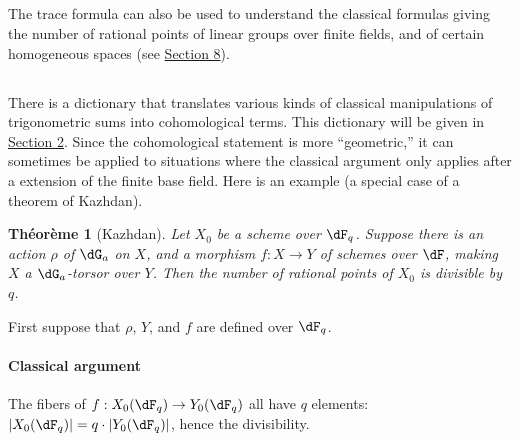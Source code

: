 \documentclass[oneside]{book}
\theoremstyle{sga-source}
\theoremstyle{sga-source-dash}
\theoremstyle{sga-source-dotdash}
\theoremstyle{sga-source-number-note-dash}
\theoremstyle{sga-source-note-number-dotdash}
\theoremstyle{sga-source-example-dotdash}
\theoremstyle{sga-source-inline-number}
\theoremstyle{sga-source-bare-number}
\theoremstyle{sga-source}
\newtheorem{theorem_}[subsection]{Théorème}
\newcommand{\PrintPage}[1]{}\newcommand{\MathPage}[1]{}\newcommand{\PrintCite}[2]{#1}\newcommand{\var}[3]{#1}
\begin{document}
\subsection{}\label{VI:1-11}

The trace formula can also be used to understand the classical formulas 
giving the number of rational points of linear groups over 
finite fields, and of certain homogeneous spaces (see \hyperref[VI:8]{Section 8}). 





\subsection{}\label{VI:1-12}

There is a dictionary that translates various kinds of classical 
manipulations of trigonometric sums into cohomological terms. This dictionary 
will be given in \hyperref[VI:2]{Section 2}. Since the cohomological statement is more 
``geometric,'' it can sometimes be applied 
to situations where the classical argument only applies after a 
extension of the finite base field. Here is an example (a special case of a 
theorem of Kazhdan).

\begin{theorem_}[Kazhdan]\label{VI:1-13}
Let $X_0$ be a scheme over $\dF_q$. Suppose there is an action $\rho$ of 
$\dG_a$ on $X$, and a morphism $f:X\to Y$ of schemes over $\dF$, making 
$X$ a $\dG_a$-torsor over $Y$. Then the number of rational points of $X_0$ 
is divisible by $q$.
\end{theorem_}

\PrintPage{176}
First suppose that $\rho$, $Y$, and $f$ are defined over $\dF_q$. 


\paragraph{Classical argument}
The fibers of $f:X_0(\dF_q)\to Y_0(\dF_q)$ all have $q$ elements: 
$|X_0(\dF_q)| = q\cdot |Y_0(\dF_q)|$, hence the divisibility. 
\end{document}
